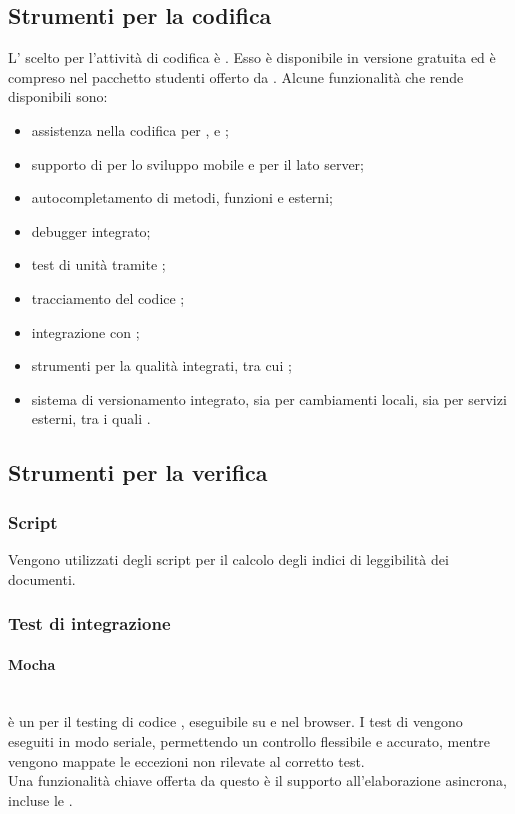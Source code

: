\subsection{Strumenti per la codifica}
L' scelto per l'attività di codifica è \textbf{}. Esso è disponibile in versione gratuita ed è compreso nel pacchetto studenti offerto da . Alcune funzionalità che rende disponibili sono:
\begin{itemize}
	\item assistenza nella codifica per ,  e ;
	\item supporto di  per lo sviluppo mobile e  per il lato server;
	\item autocompletamento di metodi, funzioni e  esterni;
	\item debugger integrato;
	\item test di unità tramite ;
	\item tracciamento del codice ;
	\item integrazione con ;
	\item strumenti per la qualità integrati, tra cui ;
	\item sistema di versionamento integrato, sia per cambiamenti locali, sia per servizi esterni, tra i quali .
\end{itemize}

\subsection{Strumenti per la verifica}
\subsubsection{Script}
Vengono utilizzati degli script per il calcolo degli indici di leggibilità dei documenti.

\subsubsection{Test di integrazione}
\paragraph{Mocha}\mbox{}\\
 è un  per il testing di codice , eseguibile su  e nel browser. I test di  vengono eseguiti in modo seriale, permettendo un controllo flessibile e accurato, mentre vengono mappate le eccezioni non rilevate al corretto test.\\
Una funzionalità chiave offerta da questo  è il supporto all’elaborazione asincrona, incluse le .

